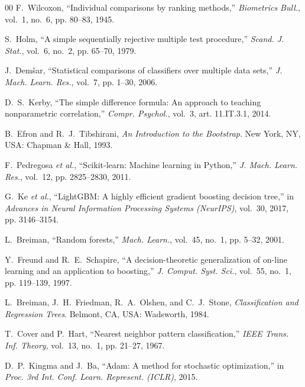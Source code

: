 \documentclass[conference]{IEEEtran}
\begin{document}
\begin{thebibliography}{00}
F.~Wilcoxon, ``Individual comparisons by ranking methods,'' \textit{Biometrics Bull.}, vol.~1, no.~6, pp. 80--83, 1945.

S.~Holm, ``A simple sequentially rejective multiple test procedure,'' \textit{Scand. J. Stat.}, vol.~6, no.~2, pp. 65--70, 1979.

J.~Dem{\v{s}}ar, ``Statistical comparisons of classifiers over multiple data sets,'' \textit{J. Mach. Learn. Res.}, vol.~7, pp. 1--30, 2006.

D.~S.~Kerby, ``The simple difference formula: An approach to teaching nonparametric correlation,'' \textit{Compr. Psychol.}, vol.~3, art. 11.IT.3.1, 2014.

B.~Efron and R.~J.~Tibshirani, \textit{An Introduction to the Bootstrap}. New York, NY, USA: Chapman \& Hall, 1993.

F.~Pedregosa \textit{et al.}, ``Scikit-learn: Machine learning in Python,'' \textit{J. Mach. Learn. Res.}, vol.~12, pp. 2825--2830, 2011.

G.~Ke \textit{et al.}, ``LightGBM: A highly efficient gradient boosting decision tree,'' in \textit{Advances in Neural Information Processing Systems (NeurIPS)}, vol.~30, 2017, pp. 3146--3154.

L.~Breiman, ``Random forests,'' \textit{Mach. Learn.}, vol.~45, no.~1, pp. 5--32, 2001.

Y.~Freund and R.~E.~Schapire, ``A decision-theoretic generalization of on-line learning and an application to boosting,'' \textit{J. Comput. Syst. Sci.}, vol.~55, no.~1, pp. 119--139, 1997.

L.~Breiman, J.~H.~Friedman, R.~A.~Olshen, and C.~J.~Stone, \textit{Classification and Regression Trees}. Belmont, CA, USA: Wadsworth, 1984.

T.~Cover and P.~Hart, ``Nearest neighbor pattern classification,'' \textit{IEEE Trans. Inf. Theory}, vol.~13, no.~1, pp. 21--27, 1967.

D.~P.~Kingma and J.~Ba, ``Adam: A method for stochastic optimization,'' in \textit{Proc. 3rd Int. Conf. Learn. Represent. (ICLR)}, 2015.
\end{thebibliography}
\end{document}
